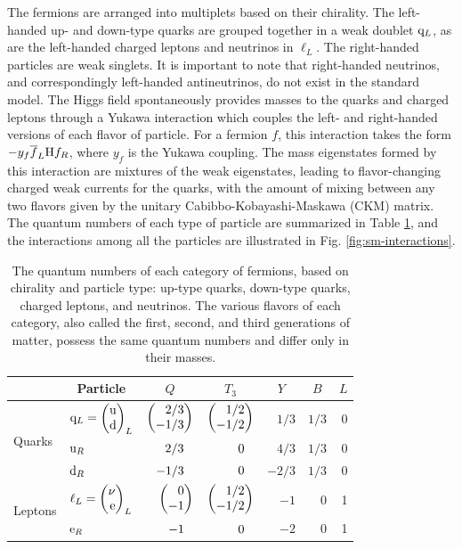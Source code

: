 \documentclass[12pt]{thesis}  %
\makeatletter
\newcommand\doublet[3][c]{\left(%
        \begin{array}{@{}#1@{}}#2\\#3%
\end{array}%
\right)%
}
\newcommand{\Pe}{\ensuremath{\cmsSymbolFace{e}}\xspace}
\makeatother
\begin{document}
The fermions are arranged into multiplets based on their chirality. The left-handed up- and down-type quarks are grouped together in a weak doublet $\mathrm{q}_L$, as are the left-handed charged leptons and neutrinos in $\ell_L$. The right-handed particles are weak singlets. It is important to note that right-handed neutrinos, and correspondingly left-handed antineutrinos, do not exist in the standard model. The Higgs field spontaneously provides masses to the quarks and charged leptons through a Yukawa interaction which couples the left- and right-handed versions of each flavor of particle. For a fermion $f$, this interaction takes the form $-y_{f} \overline{f}_{L} \mathrm{H} f_{R}$, where $y_{f}$ is the Yukawa coupling. The mass eigenstates formed by this interaction are mixtures of the weak eigenstates, leading to flavor-changing charged weak currents for the quarks, with the amount of mixing between any two flavors given by the unitary Cabibbo-Kobayashi-Maskawa (CKM) matrix. The quantum numbers of each type of particle are summarized in Table \ref{tab:q-num}, and the interactions among all the particles are illustrated in Fig. \ref{fig:sm-interactions}.

\begin{table}[htb]
  \begin{center}
    \begin{tabular}{|l||l|r|r|r|r|r|}
\hline
      & \multicolumn{1}{c|}{Particle} & \multicolumn{1}{c|}{$Q$} & \multicolumn{1}{c|}{$T_3$} & \multicolumn{1}{c|}{$Y$} & \multicolumn{1}{c|}{$B$} & \multicolumn{1}{c|}{$L$} \\
\hline
\hline
\multirow{3}{*}{Quarks}  
\rule{0pt}{24pt}         & $\cPq_L = \doublet[r]{\cPqu}{\cPqd}_L$ & $\doublet[r]{2/3}{-1/3}$ & $\doublet[r]{1/2}{-1/2}$ & $1/3$  & $1/3$ & 0 \\
                         & $\mathrm{u}_R$                              & $2/3\hphantom{\bigg)}$   & $0\hphantom{\bigg)}$     & $4/3$  & $1/3$ & 0 \\
                         & $\mathrm{d}_R$                              & $-1/3\hphantom{\bigg)}$  & $0\hphantom{\bigg)}$     & $-2/3$ & $1/3$ & 0 \\
\hline
\hline
\multirow{2}{*}{Leptons} 
\rule{0pt}{24pt}         & $\ell_L = \doublet[r]{\nu}{\Pe}_L$     & $\doublet[r]{0}{-1}$     & $\doublet[r]{1/2}{-1/2}$ & $-1$   & 0     & 1 \\
                         & $\Pe_R$                                & $-1\hphantom{\bigg)}$    & $0\hphantom{\bigg)}$     & $-2$   & 0     & 1 \\
\hline
    \end{tabular}
    \caption{The quantum numbers of each category of fermions, based on chirality and particle type: up-type quarks, down-type quarks, charged leptons, and neutrinos. The various flavors of each category, also called the first, second, and third generations of matter, possess the same quantum numbers and differ only in their masses.}
    \label{tab:q-num}
  \end{center}
\end{table}
\end{document}
